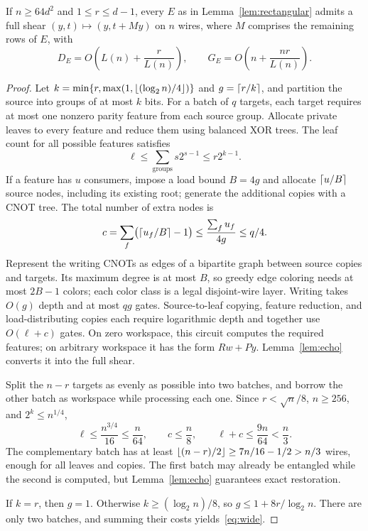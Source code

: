 \begin{lemma}\label{lem:wide}
If $n\ge64d^2$ and $1\le r\le d-1$, every $E$ as in Lemma~\ref{lem:rectangular} admits a full shear $(y,t)\mapsto(y,t+My)$ on $n$ wires, where $M$ comprises the remaining rows of $E$, with
\begin{equation}\label{eq:wide}
D_E=O\left(L(n)+\frac r{L(n)}\right),\qquad
G_E=O\left(n+\frac{nr}{L(n)}\right).
\end{equation}
\end{lemma}
\begin{proof}
Let $k=\min\{r,\max(1,\left\lfloor (\log_2n)/4\right\rfloor)\}$ and $g=\left\lceil r/k\right\rceil$, and partition the source into groups of at most $k$ bits. For a batch of $q$ targets, each target requires at most one nonzero parity feature from each source group. Allocate private leaves to every feature and reduce them using balanced XOR trees. The leaf count for all possible features satisfies
\[
\ell\le\sum_{\text{groups}}s2^{s-1}\le r2^{k-1}.
\]
If a feature has $u$ consumers, impose a load bound $B=4g$ and allocate $\left\lceil u/B\right\rceil$ source nodes, including its existing root; generate the additional copies with a CNOT tree. The total number of extra nodes is
\[
c=\sum_f\bigl(\left\lceil u_f/B\right\rceil-1\bigr)\le\frac{\sum_fu_f}{4g}\le q/4.
\]
Represent the writing CNOTs as edges of a bipartite graph between source copies and targets. Its maximum degree is at most $B$, so greedy edge coloring needs at most $2B-1$ colors; each color class is a legal disjoint-wire layer. Writing takes $O(g)$ depth and at most $qg$ gates. Source-to-leaf copying, feature reduction, and load-distributing copies each require logarithmic depth and together use $O(\ell+c)$ gates. On zero workspace, this circuit computes the required features; on arbitrary workspace it has the form $Rw+Py$. Lemma~\ref{lem:echo} converts it into the full shear.

Split the $n-r$ targets as evenly as possible into two batches, and borrow the other batch as workspace while processing each one. Since $r<\sqrt n/8$, $n\ge256$, and $2^k\le n^{1/4}$,
\[
\ell\le\frac{n^{3/4}}{16}\le\frac n{64},\qquad
c\le\frac n8,\qquad \ell+c\le\frac{9n}{64}<\frac n3.
\]
The complementary batch has at least $\left\lfloor (n-r)/2\right\rfloor\ge7n/16-1/2>n/3$ wires, enough for all leaves and copies. The first batch may already be entangled while the second is computed, but Lemma~\ref{lem:echo} guarantees exact restoration.

If $k=r$, then $g=1$. Otherwise $k\ge(\log_2n)/8$, so $g\le1+8r/\log_2n$. There are only two batches, and summing their costs yields~\eqref{eq:wide}.
\end{proof}


